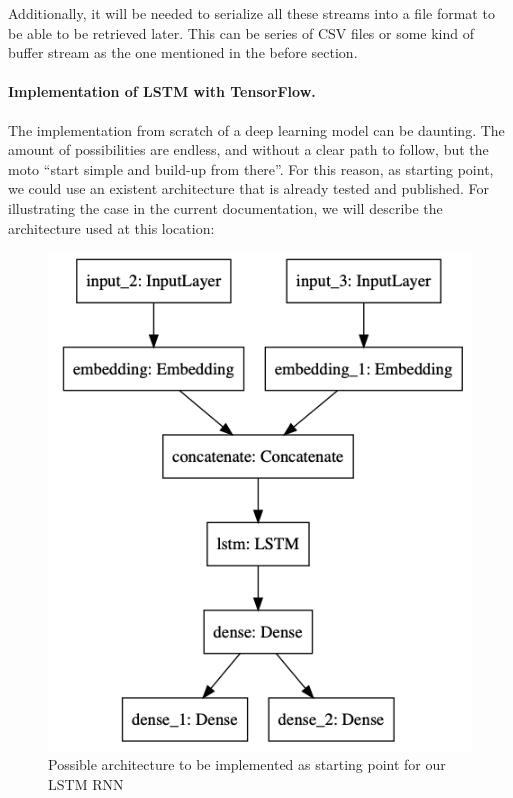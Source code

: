 Additionally, it will be needed to serialize all these streams into a file format to be
able to be retrieved later. This can be series of CSV files or some kind of buffer stream
as the one mentioned in the before section.


\paragraph{Implementation of LSTM with TensorFlow.} The implementation from scratch of a deep learning
model can be daunting. The amount of possibilities are endless, and without a clear path
to follow, but the moto “start simple and build-up from there”. For this reason, as
starting point, we could use an existent architecture that is already tested and
published. For illustrating the case in the current documentation, we will describe the
architecture used at this location:

\begin{figure}[h!]
  \includegraphics[width=\linewidth]{image/fig_JDF21.png}
  \caption{Possible architecture to be implemented as starting point for our LSTM RNN }
\end{figure}


